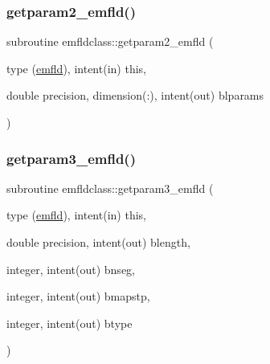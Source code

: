 \mbox{\label{namespaceemfldclass_af928aa17c18a7ebd339aece97387154b}} 
\subsubsection{\texorpdfstring{getparam2\_emfld()}{getparam2\_emfld()}}
{\footnotesize\ttfamily subroutine emfldclass\+::getparam2\+\_\+emfld (\begin{DoxyParamCaption}\item[{type (\mbox{\hyperlink{namespaceemfldclass_structemfldclass_1_1emfld}{emfld}}), intent(in)}]{this,  }\item[{double precision, dimension(\+:), intent(out)}]{blparams }\end{DoxyParamCaption})}

\mbox{\label{namespaceemfldclass_a07a0d1aa7a4dc67bcec915f0d5d0945e}} 
\subsubsection{\texorpdfstring{getparam3\_emfld()}{getparam3\_emfld()}}
{\footnotesize\ttfamily subroutine emfldclass\+::getparam3\+\_\+emfld (\begin{DoxyParamCaption}\item[{type (\mbox{\hyperlink{namespaceemfldclass_structemfldclass_1_1emfld}{emfld}}), intent(in)}]{this,  }\item[{double precision, intent(out)}]{blength,  }\item[{integer, intent(out)}]{bnseg,  }\item[{integer, intent(out)}]{bmapstp,  }\item[{integer, intent(out)}]{btype }\end{DoxyParamCaption})}

\mbox{\label{namespaceemfldclass_af90bd5467acb5c62a2d93f6eb1738097}} 
